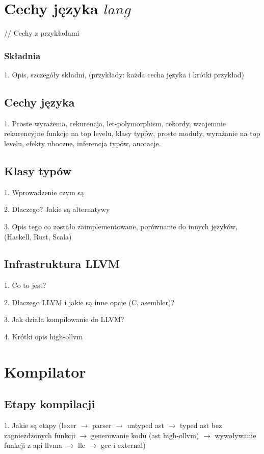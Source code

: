 \documentclass[declaration,shortabstract]{iithesis}
\begin{document}
\chapter{Cechy języka $lang$}

// Cechy z przykładami


\subsection{Składnia}

1. Opis, szczegóły składni, (przykłady: każda cecha języka i krótki przykład)

\section{Cechy języka}

1. Proste wyrażenia, rekurencja, let-polymorphism, rekordy,
wzajemnie rekurencyjne funkcje na top levelu, klasy typów, proste moduły, 
wyrażanie na top levelu, efekty uboczne, inferencja typów, anotacje.

\section{Klasy typów}

1. Wprowadzenie czym są 

2. Dlaczego? Jakie są alternatywy

3. Opis tego co zostało zaimplementowane, porównanie do innych języków, (Haskell,
Rust, Scala)

\section{Infrastruktura LLVM}

1. Co to jest? 

2. Dlaczego LLVM i jakie są inne opcje (C, asembler)? 

3. Jak działa kompilowanie do LLVM? 

4. Krótki opis high-ollvm 

\chapter{Kompilator}
\section{Etapy kompilacji}

1. Jakie są etapy (lexer $\rightarrow$ parser $\rightarrow$ untyped ast $\rightarrow$ 
typed ast bez zagnieżdżonych funkcji $\rightarrow$ generowanie kodu (ast high-ollvm)
$\rightarrow$ wywoływanie funkcji z api llvma $\rightarrow$ llc $\rightarrow$ gcc i external) 
\end{document}
